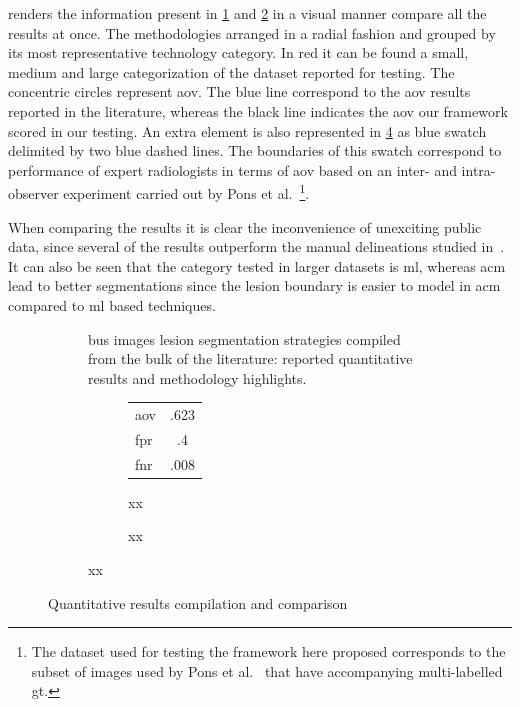  renders the information present in \cref{fig:surveyResults:survey} and \cref{fig:surveyResults:method} in a visual manner compare all the results at once.
The methodologies arranged in a radial fashion and grouped by its most representative technology category. 
In red it can be found a small, medium and large categorization of the dataset reported for testing.
The concentric circles represent \ac{aov}. 
The blue line correspond to the \ac{aov} results reported in the literature, whereas the black line indicates the \ac{aov} our framework scored in our testing.
An extra element is also represented in \cref{fig:surveyResults:comparison} as blue swatch delimited by two blue dashed lines.
The boundaries of this swatch correspond to performance of expert radiologists in terms of \ac{aov} based on an inter- and intra-observer experiment carried out by Pons et al.~\cite{gerard2013}\footnote{The dataset used for testing the framework here proposed corresponds to the subset of images used by Pons et al.~\cite{gerard2013} that have accompanying multi-labelled \ac{gt}.}.

When comparing the results it is clear the inconvenience of unexciting public data, since several of the results outperform the manual delineations studied in~\cite{gerard2013}.
It can also be seen that the category tested in larger datasets is \ac{ml}, whereas \ac{acm} lead to better segmentations since the lesion boundary is easier to model in \ac{acm} compared to \ac{ml} based techniques.


\begin{figure}[h]
  \begin{subfigure}[b]{\textwidth}
    {\tiny }
    \caption{\ac{bus} images lesion segmentation strategies compiled from the bulk of the literature: reported quantitative results and methodology highlights.}
    \label{fig:surveyResults:survey}
  \end{subfigure}
  \begin{subfigure}[b]{\textwidth}
    \begin{subfigure}[b]{0.2\textwidth}
      \begin{tabular}{lc}
        \ac{aov}& .623 \\
        \ac{fpr}& .4 \\
        \ac{fnr}& .008 \\
      \end{tabular}
      \caption{xx}
      \label{fig:surveyResults:method}
    \end{subfigure}
    \begin{subfigure}[b]{0.8\textwidth}
      {\tiny  }
      \caption{{\small xx}}
      \label{fig:surveyResults:comparison}
    \end{subfigure}
  \end{subfigure}
  \hfill
  \caption{Quantitative results compilation and comparison}
  \label{fig:surveyResults}
\end{figure}



